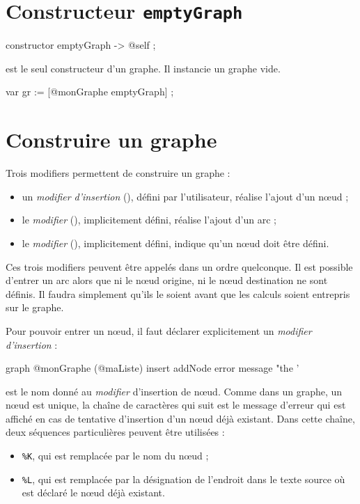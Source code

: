 \section{Constructeur \texttt{emptyGraph}}

\begin{galgascode}
constructor emptyGraph -> @self ;
\end{galgascode}

 est le seul constructeur d'un graphe. Il instancie un graphe vide.

\begin{galgascode}
var gr := [@monGraphe emptyGraph] ;
\end{galgascode}



\section{Construire un graphe}

Trois modifiers permettent de construire un graphe :
\begin{itemize}
  \item un \emph{modifier d'insertion} (), défini par l'utilisateur, réalise l'ajout d'un nœud ;
  \item le \emph{modifier}  (), implicitement défini, réalise l'ajout d'un arc ;
  \item le \emph{modifier}  (), implicitement défini, indique qu'un nœud doit être défini.
\end{itemize}

Ces trois modifiers peuvent être appelés dans un ordre quelconque. Il est possible d'entrer un arc alors que ni le nœud origine, ni le nœud destination ne sont définis. Il faudra simplement qu'ils le soient avant que les calculs soient entrepris sur le graphe.


Pour pouvoir entrer un nœud, il faut déclarer explicitement un \emph{modifier d'insertion} :
\begin{galgascode}
graph @monGraphe (@maListe) {
  insert addNode error message "the '%
}
\end{galgascode}

 est le nom donné au \emph{modifier} d'insertion de nœud. Comme dans un graphe, un nœud est unique, la chaîne de caractères qui suit  est le message d'erreur qui est affiché en cas de tentative d'insertion d'un nœud déjà existant. Dans cette chaîne, deux séquences particulières peuvent être utilisées :
\begin{itemize}
  \item \colorbox{\couleurCodeGALGAS}{\texttt{\%K}}, qui est remplacée par le nom du nœud ;
  \item \colorbox{\couleurCodeGALGAS}{\texttt{\%L}}, qui est remplacée par la désignation de l'endroit dans le texte source où est déclaré le nœud déjà existant.
\end{itemize}

